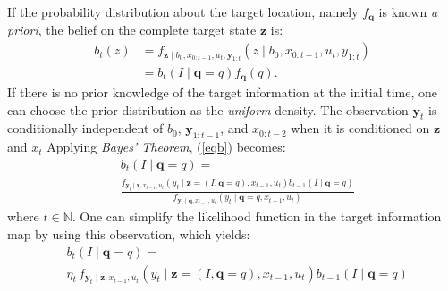 \documentclass[letterpaper, 10 pt, conference]{ieeeconf}
\newcommand{\Ram}[1]{{\normalsize{\textbf{({\color{green}Ram:\ }#1)}}}}
\begin{document}
If the probability distribution about the target location, namely $f_{\bm{q}}$ is known \emph{a priori}, the belief on the complete target state $\bm{z}$ is:
\begin{align}
b_t(z)&=
f_{\bm{z} \mid b_0,{x}_{0:t-1},u_t,\bm{y}_{1:t}}
\left(
z \mid b_0,
{x}_{0:t-1},u_t,y_{1:t}
\right) \nonumber  \\
&=
b_t(I\mid \bm{q}=q)f_{\bm{q}}(q). 
\label{eq0}
\end{align}
If there is no prior knowledge of the target information at the initial time, one can choose the prior distribution as the \emph{uniform} density. 
The observation $\bm{y}_{t}$ is conditionally independent of $b_0$, $\bm{y}_{1:t-1}$, and $x_{0:t-2}$ when it is conditioned on $\bm{z}$ and $x_t$ 
Applying \emph{Bayes' Theorem}, (\ref{eqb}) becomes:
{\small{
\begin{align*}
&b_{t}(I \mid \bm{q} =q)=\\
&
\frac{
	f_{\bm{y}_{t} \mid
\bm{z},
{x}_{t-1},u_t	
}\left(
	y_{t} \mid
	\bm{z}=(I,\bm{q}=q),
	{x}_{t-1},u_t
\right)
b_{t-1}(I\mid \bm{q} = q)
}
{
f_{\bm{y}_{t} \mid
		\bm{q},
		{x}_{t-1},u_t	
	}\left(
	y_{t} \mid
\bm{q}=q,
	{x}_{t-1},u_t
	\right)
}
\end{align*}}}where $t \in \mathbb{N}$.
One can simplify the likelihood function in the target information map by using this observation, which yields:
\begin{align}
&b_{t}(I \mid \bm{q} = q)= \nonumber \\
&\eta_t\,
	f_{\bm{y}_{t} \mid
		\bm{z},{x}_{t-1},u_t}\left(
	y_{t} \mid
	\bm{z}=(I,\bm{q}=q),{x}_{t-1},u_t\right)
	b_{t-1}(I \mid \bm{q} = q)
	\label{eq1}
\end{align}
\end{document}
